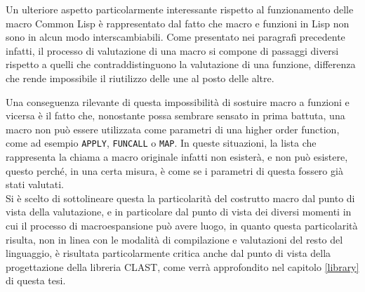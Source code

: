 Un ulteriore aspetto particolarmente interessante rispetto al funzionamento
delle macro Common Lisp è rappresentato dal fatto che macro e funzioni in Lisp
non sono in alcun modo interscambiabili. Come presentato nei paragrafi
precedente infatti, il processo di valutazione di una macro si compone di
passaggi diversi rispetto a quelli che contraddistinguono la valutazione di una
funzione, differenza che rende impossibile il riutilizzo delle une al posto
delle altre.

Una conseguenza rilevante di questa impossibilità di sostuire macro a funzioni e
vicersa è il fatto che, nonostante possa sembrare sensato in prima battuta, una
macro non può essere utilizzata come parametri di una higher order function,
come ad esempio \texttt{APPLY}, \texttt{FUNCALL} o \texttt{MAP}. In queste
situazioni, la lista che rappresenta la chiama a macro originale infatti non
esisterà, e non può esistere, questo perché, in una certa misura, è come se i
parametri di questa fossero già stati valutati.\\

Si è scelto di sottolineare questa la particolarità del costrutto macro dal
punto di vista della valutazione, e in particolare dal punto di vista dei
diversi momenti in cui il processo di macroespansione può avere luogo, in quanto
questa particolarità risulta, non in linea con le modalità di compilazione e
valutazioni del resto del linguaggio, è risultata particolarmente critica anche
dal punto di vista della progettazione della libreria CLAST, come verrà
approfondito nel capitolo \ref{library} di questa tesi.
